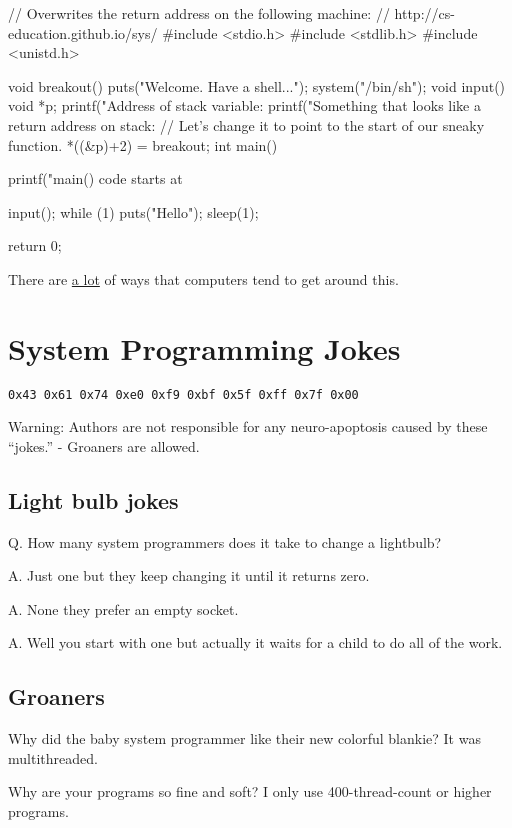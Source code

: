 \begin{code}[language=C]
// Overwrites the return address on the following machine:
// http://cs-education.github.io/sys/
#include <stdio.h>
#include <stdlib.h>
#include <unistd.h>

void breakout() {
    puts("Welcome. Have a shell...");
    system("/bin/sh");
}
void input() {
  void *p;
  printf("Address of stack variable: %
  printf("Something that looks like a return address on stack: %
  // Let's change it to point to the start of our sneaky function.
  *((&p)+2) = breakout;
}
int main() {
    printf("main() code starts at %
    
    input();
    while (1) {
        puts("Hello");
        sleep(1);
    }

    return 0;
}
\end{code}

There are \href{https://en.wikipedia.org/wiki/Stack_buffer_overflow}{a lot} of ways that computers tend to get around this.

\section{System Programming Jokes}

\texttt{0x43\ 0x61\ 0x74\ 0xe0\ 0xf9\ 0xbf\ 0x5f\ 0xff\ 0x7f\ 0x00}

Warning: Authors are not responsible for any neuro-apoptosis caused by these ``jokes.'' - Groaners are allowed.

\subsection{Light bulb jokes}

Q. How many system programmers does it take to change a lightbulb?

A. Just one but they keep changing it until it returns zero.

A. None they prefer an empty socket.

A. Well you start with one but actually it waits for a child to do all of the work.

\subsection{Groaners}

Why did the baby system programmer like their new colorful blankie? It was multithreaded.

Why are your programs so fine and soft? I only use 400-thread-count or higher programs.

